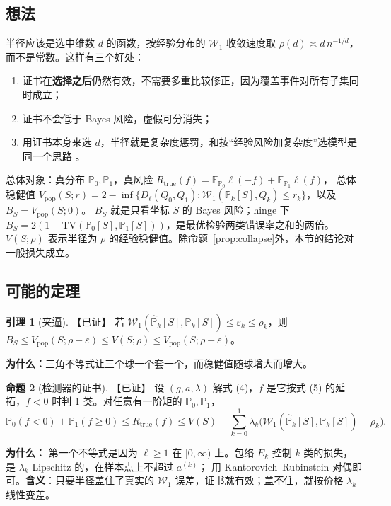 \documentclass[11pt,a4paper,fontset=none]{ctexart}
\newcommand{\Nref}[2]{\hyperref[#2]{#1~\ref*{#2}}}
\newcommand{\TV}{\mathrm{TV}}
\newcommand{\Vp}{V_{\mathrm{pop}}}
\newcommand{\Rt}{R_{\mathrm{true}}}
\theoremstyle{definition}
\newtheorem{proposition}{命题}
\newtheorem{lemma}[proposition]{引理}
\newenvironment{why}{\par\noindent\textbf{为什么：}\ignorespaces}{\par}
\newcommand{\status}[1]{\textrm{【#1】}}
\begin{document}
\subsection{想法}
半径应该是选中维数 $d$ 的函数，按经验分布的 $\mathcal W_1$ 收敛速度取 $\rho(d)\asymp d\,n^{-1/d}$，而不是常数。这样有三个好处：
\begin{enumerate}
\item 证书在\textbf{选择之后}仍然有效，不需要多重比较修正，因为覆盖事件对所有子集同时成立；
\item 证书不会低于 Bayes 风险，虚假可分消失；
\item 用证书本身来选 $d$，半径就是复杂度惩罚，和按“经验风险加复杂度”选模型是同一个思路 \cite{bartlett2002model}。
\end{enumerate}
总体对象：真分布 $\mathbb P_0,\mathbb P_1$，真风险 $\Rt(f)=\mathbb E_{\mathbb P_0}\ell(-f)+\mathbb E_{\mathbb P_1}\ell(f)$，
总体稳健值 $\Vp(S;r)=2-\inf\{D_\ell(Q_0,Q_1):\mathcal W_1(\mathbb P_k[S],Q_k)\le r_k\}$，以及 $B_S=\Vp(S;0)$。
$B_S$ 就是只看坐标 $S$ 的 Bayes 风险；hinge 下 $B_S=2(1-\TV(\mathbb P_0[S],\mathbb P_1[S]))$，是最优检验两类错误率之和的两倍。
$V(S;\rho)$ 表示半径为 $\rho$ 的经验稳健值。除\Nref{命题}{prop:collapse}外，本节的结论对一般损失成立。

\subsection{可能的定理}
\begin{lemma}[夹逼]\label{lem:sandwich}\status{已证}
若 $\mathcal W_1(\widehat{\mathbb P}_k[S],\mathbb P_k[S])\le\varepsilon_k\le\rho_k$，则
$B_S\le\Vp(S;\rho-\varepsilon)\le V(S;\rho)\le\Vp(S;\rho+\varepsilon)$。
\end{lemma}
\begin{why}三角不等式让三个球一个套一个，而稳健值随球增大而增大。\end{why}

\begin{proposition}[检测器的证书]\label{prop:honest}\status{已证}
设 $(g,a,\lambda)$ 解式 (4)，$f$ 是它按式 (5) 的延拓，$f<0$ 时判 1 类。对任意有一阶矩的 $\mathbb P_0,\mathbb P_1$，
\[
\mathbb P_0(f<0)+\mathbb P_1(f\ge0)\le\Rt(f)\le V(S)+\sum_{k=0}^1\lambda_k\bigl(\mathcal W_1(\widehat{\mathbb P}_k[S],\mathbb P_k[S])-\rho_k\bigr).
\]
\end{proposition}
\begin{why}
第一个不等式是因为 $\ell\ge1$ 在 $[0,\infty)$ 上。包络 $E_k$ 控制 $k$ 类的损失，是 $\lambda_k$-Lipschitz 的，在样本点上不超过 $a^{(k)}$；
用 Kantorovich--Rubinstein 对偶即可。\textbf{含义}：只要半径盖住了真实的 $\mathcal W_1$ 误差，证书就有效；盖不住，就按价格 $\lambda_k$ 线性变差。
\end{why}
\end{document}
